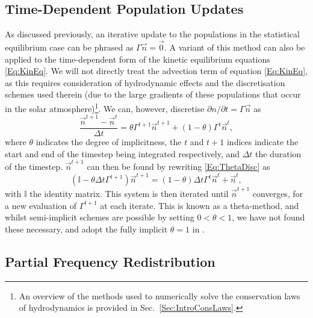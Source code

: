 \subsection{Time-Dependent Population Updates}\label{Sec:TimeDepPopUpdates}

As discussed previously, an iterative update to the populations in the statistical equilibrium case can be phrased as $\Gamma \vec{n} = \vec{0}$.
A variant of this method can also be applied to the time-dependent form of the kinetic equilibrium equations \eqref{Eq:KinEq}.
We will not directly treat the advection term of equation \eqref{Eq:KinEq}, as this requires consideration of hydrodynamic effects and the discretisation schemes used therein (due to the large gradients of these populations that occur in the solar atmosphere)\footnote{An overview of the methods used to numerically solve the conservation laws of hydrodynamics is provided in Sec.~\ref{Sec:IntroConsLaws}.}.
We can, however, discretise $\partial n / \partial t = \Gamma \vec{n}$ as
\begin{equation}
    \label{Eq:ThetaDisc}
    \frac{\vec{n}^{t+1} - \vec{n}^t}{\Delta t} = \theta \Gamma^{t+1} \vec{n}^{t+1} + (1-\theta)\Gamma^{t} \vec{n}^{t},
\end{equation}
where $\theta$ indicates the degree of implicitness, the $t$ and $t+1$ indices indicate the start and end of the timestep being integrated respectively, and $\Delta t$ the duration of the timestep.
$\vec{n}^{t+1}$ can then be found by rewriting \eqref{Eq:ThetaDisc} as
\begin{equation}
    \label{Eq:TimeDepSystem}
    (\mathbb{I} - \theta\Delta t \Gamma^{t+1}) \vec{n}^{t+1} = (1-\theta)\Delta t \Gamma^{t}\vec{n}^{t} + \vec{n}^{t},
\end{equation}
with $\mathbb{I}$ the identity matrix.
This system is then iterated until $\vec{n}^{t+1}$ converges, for a new evaluation of $\Gamma^{t+1}$ at each iterate.
This is known as a theta-method, and whilst semi-implicit schemes are possible by setting $0 < \theta < 1$, we have not found these necessary, and adopt the fully implicit $\theta=1$ in \Lw{}.

\subsection{Partial Frequency Redistribution}\label{Sec:Prd}

